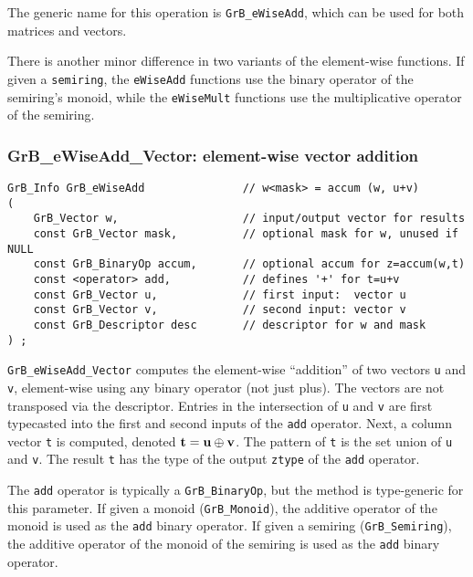 \documentclass[12pt]{article}
\begin{document}
The generic name for this operation is \verb'GrB_eWiseAdd', which can be used
for both matrices and vectors.

There is another minor difference in two variants of the element-wise
functions.  If given a \verb'semiring', the \verb'eWiseAdd' functions use the
binary operator of the semiring's monoid, while the \verb'eWiseMult' functions
use the multiplicative operator of the semiring.

\subsubsection{{\sf GrB\_eWiseAdd\_Vector:} element-wise vector addition}
\label{eWiseAdd_vector}

\begin{mdframed}[userdefinedwidth=6in]
{\footnotesize
\begin{verbatim}
GrB_Info GrB_eWiseAdd               // w<mask> = accum (w, u+v)
(
    GrB_Vector w,                   // input/output vector for results
    const GrB_Vector mask,          // optional mask for w, unused if NULL
    const GrB_BinaryOp accum,       // optional accum for z=accum(w,t)
    const <operator> add,           // defines '+' for t=u+v
    const GrB_Vector u,             // first input:  vector u
    const GrB_Vector v,             // second input: vector v
    const GrB_Descriptor desc       // descriptor for w and mask
) ;
\end{verbatim} } \end{mdframed}

\verb'GrB_eWiseAdd_Vector' computes the element-wise ``addition'' of two
vectors \verb'u' and \verb'v', element-wise using any binary operator (not just
plus).  The vectors are not transposed via the descriptor.  Entries in the
intersection of \verb'u' and \verb'v' are first typecasted into the first and
second inputs of the \verb'add' operator.  Next, a column vector \verb't' is
computed, denoted ${\bf t = u \oplus v}$.  The pattern of \verb't' is the set
union of \verb'u' and \verb'v'.  The result \verb't' has the type of the output
\verb'ztype' of the \verb'add' operator.

The \verb'add' operator is typically a \verb'GrB_BinaryOp', but the method is
type-generic for this parameter.  If given a monoid (\verb'GrB_Monoid'), the
additive operator of the monoid is used as the \verb'add' binary operator.  If
given a semiring (\verb'GrB_Semiring'), the additive operator of the monoid of
the semiring is used as the \verb'add' binary operator.
\end{document}
